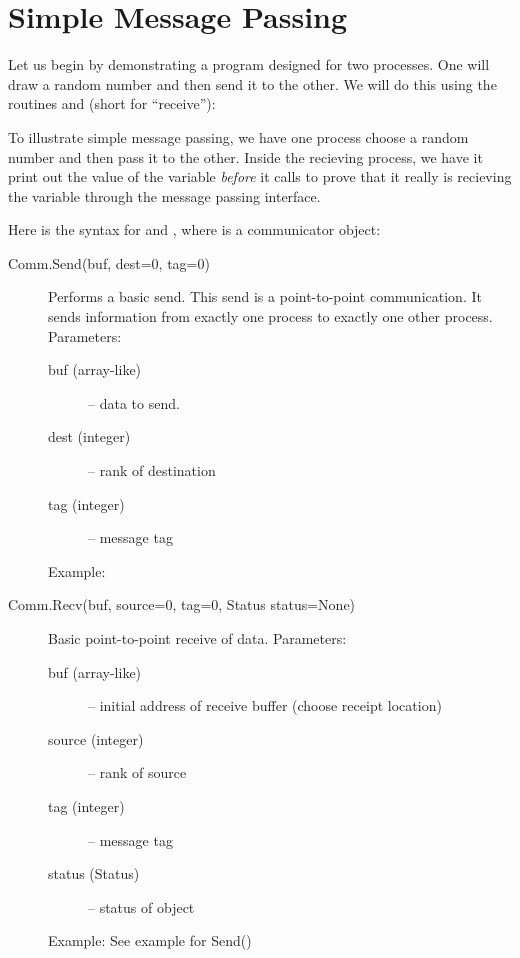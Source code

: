 \section*{Simple Message Passing}
Let us begin by demonstrating a program designed for two processes. One will draw a random number and then send it to the other. We will do this using the routines  and  (short for ``receive''):



To illustrate simple message passing, we have one process choose a random number and then pass it to the other. Inside the recieving process, we have it print out the value of the variable  \emph{before} it calls  to prove that it really is recieving the variable through the message passing interface.

Here is the syntax for  and , where  is a communicator object:

\begin{description}
\item[Comm.Send(buf, dest=0, tag=0)]
Performs a basic send. This send is a point-to-point communication. It sends information from exactly one process to exactly one other process.
Parameters:
\begin{description}
\item[buf (array-like)] – data to send.
    

\item[dest (integer)] – rank of destination
\item[tag (integer)] – message tag
\end{description}
Example:

\item[Comm.Recv(buf, source=0, tag=0, Status status=None)]
Basic point-to-point receive of data.
Parameters:
\begin{description}
\item[buf (array-like)] – initial address of receive buffer (choose receipt location)
\item[source (integer)] – rank of source
\item[tag (integer)] – message tag
\item[status (Status)] – status of object
\end{description}
Example:
See example for Send()
\end{description}


